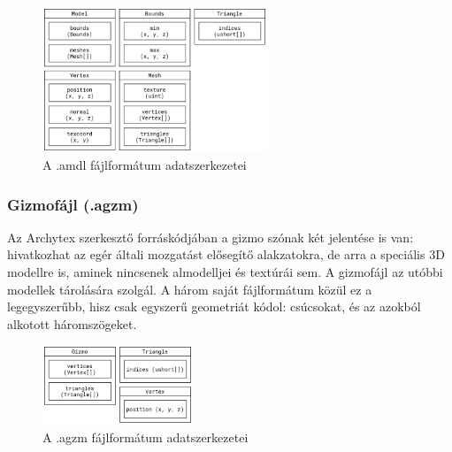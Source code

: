 \begin{figure}[h]
      \centering
      \includegraphics[width=0.6\textwidth]{parts/developer-documentation/editor/images/amdl.png}
      \caption{A .amdl fájlformátum adatszerkezetei}
\end{figure}

\subsubsection{Gizmofájl (.agzm)}

Az Archytex szerkesztő forráskódjában a gizmo szónak két jelentése is van: hivatkozhat az egér
általi mozgatást elősegítő alakzatokra, de arra a speciális 3D modellre is, aminek nincsenek
almodelljei és textúrái sem. A gizmofájl az utóbbi modellek tárolására szolgál. A három saját
fájlformátum közül ez a legegyszerűbb, hisz csak egyszerű geometriát kódol: csúcsokat, és az
azokból alkotott háromszögeket.

\begin{figure}[h]
      \centering
      \includegraphics[width=0.4\textwidth]{parts/developer-documentation/editor/images/agzm.png}
      \caption{A .agzm fájlformátum adatszerkezetei}
\end{figure}